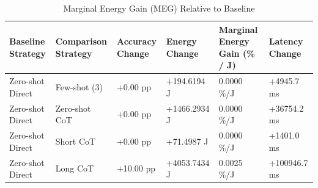 \begin{table}
\caption{Marginal Energy Gain (MEG) Relative to Baseline}
\label{tab:marginal_energy_gain}
\begin{tabular}{llllll}
\toprule
Baseline Strategy & Comparison Strategy & Accuracy Change & Energy Change & Marginal Energy Gain (\% / J) & Latency Change \\
\midrule
Zero-shot Direct & Few-shot (3) & +0.00 pp & +194.6194 J & 0.0000 \%/J & +4945.7 ms \\
Zero-shot Direct & Zero-shot CoT & +0.00 pp & +1466.2934 J & 0.0000 \%/J & +36754.2 ms \\
Zero-shot Direct & Short CoT & +0.00 pp & +71.4987 J & 0.0000 \%/J & +1401.0 ms \\
Zero-shot Direct & Long CoT & +10.00 pp & +4053.7434 J & 0.0025 \%/J & +100946.7 ms \\
\bottomrule
\end{tabular}
\end{table}
